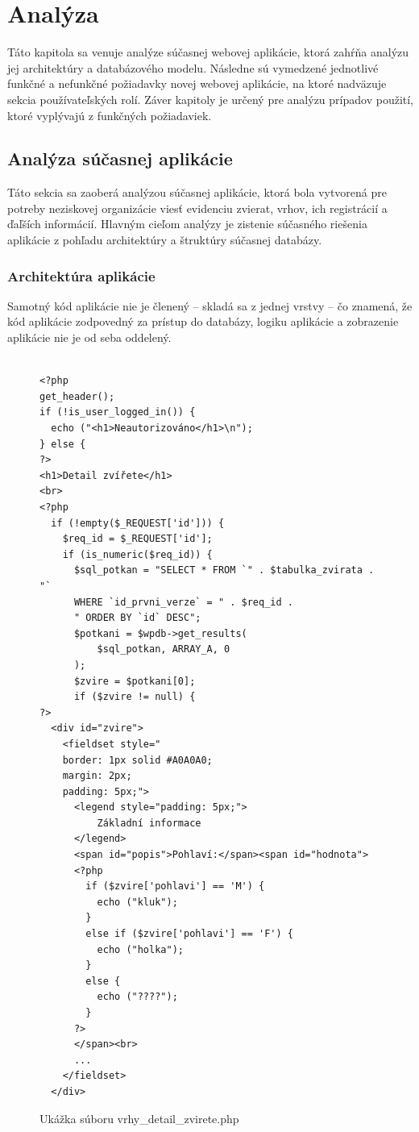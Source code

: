 \chapter{Analýza}
Táto kapitola sa venuje analýze súčasnej webovej aplikácie, ktorá zahŕňa analýzu jej architektúry a databázového modelu. Následne sú vymedzené jednotlivé funkčné a nefunkčné požiadavky novej webovej aplikácie, na ktoré nadväzuje sekcia používateľských rolí. Záver kapitoly je určený pre analýzu prípadov použití, ktoré vyplývajú z funkčných požiadaviek.

\section{Analýza súčasnej aplikácie}
Táto sekcia sa zaoberá analýzou súčasnej aplikácie, ktorá bola vytvorená pre potreby neziskovej organizácie viesť evidenciu zvierat, vrhov, ich registrácií a ďaľších informácií.
Hlavným cieľom analýzy je zistenie súčasného riešenia aplikácie z pohľadu architektúry a štruktúry súčasnej databázy.

\raggedbottom

\subsection{Architektúra aplikácie}
Samotný kód aplikácie nie je členený -- skladá sa z jednej vrstvy -- čo znamená, že kód aplikácie zodpovedný za prístup do databázy, logiku aplikácie a zobrazenie aplikácie nie je od seba oddelený.

\begin{figure}[H]
\begin{minipage}[]{\linewidth}
\begin{verbatim}

<?php
get_header();
if (!is_user_logged_in()) { 
  echo ("<h1>Neautorizováno</h1>\n");
} else {
?>
<h1>Detail zvířete</h1>
<br>
<?php
  if (!empty($_REQUEST['id'])) {
    $req_id = $_REQUEST['id'];
    if (is_numeric($req_id)) {
      $sql_potkan = "SELECT * FROM `" . $tabulka_zvirata . "`
      WHERE `id_prvni_verze` = " . $req_id .
      " ORDER BY `id` DESC";
      $potkani = $wpdb->get_results(
          $sql_potkan, ARRAY_A, 0
      );
      $zvire = $potkani[0];
      if ($zvire != null) {
?>
  <div id="zvire">
    <fieldset style="
    border: 1px solid #A0A0A0;
    margin: 2px;
    padding: 5px;">
      <legend style="padding: 5px;">
          Základní informace
      </legend>
      <span id="popis">Pohlaví:</span><span id="hodnota">
      <?php 
        if ($zvire['pohlavi'] == 'M') {
          echo ("kluk"); 
        }
        else if ($zvire['pohlavi'] == 'F') {
          echo ("holka"); 
        }
        else {
          echo ("????"); 
        }
      ?>
      </span><br>
      ...
    </fieldset>
  </div>
\end{verbatim}
\end{minipage}

\caption[Ukážka súboru vrhy\_detail\_zvirete.php]
{Ukážka súboru vrhy\_detail\_zvirete.php}
\label{current-code-example}
\end{figure}

